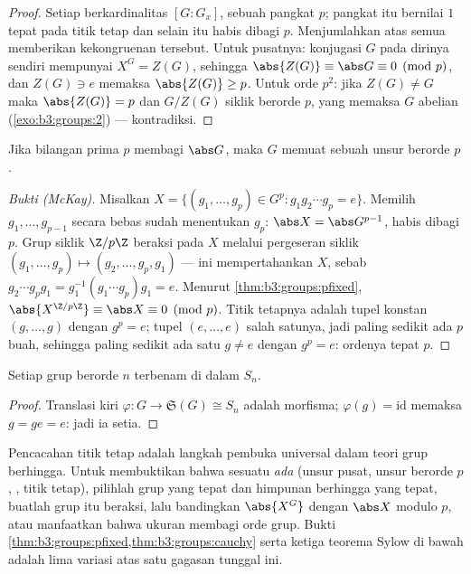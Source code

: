 \begin{proof}
Setiap  berkardinalitas $[G:G_x]$, sebuah pangkat $p$; pangkat itu
bernilai $1$ tepat pada titik tetap dan selain itu habis dibagi $p$. Menjumlahkan
atas semua  memberikan kekongruenan tersebut. Untuk pusatnya: 
konjugasi $G$ pada dirinya sendiri mempunyai $X^G = Z(G)$, sehingga $\abs{Z(G)} \equiv
\abs G \equiv 0 \pmod p$, dan $Z(G) \ni e$ memaksa $\abs{Z(G)} \geq
p$. Untuk orde $p^2$: jika $Z(G) \neq G$ maka $\abs{Z(G)} = p$ dan
$G/Z(G)$ siklik berorde $p$, yang memaksa $G$ abelian
(\cref{exo:b3:groups:2}) --- kontradiksi.
\end{proof}

\begin{theorem}[Cauchy]\label{thm:b3:groups:cauchy}
Jika bilangan prima $p$ membagi $\abs G$, maka $G$ memuat sebuah unsur
berorde $p$.
\end{theorem}

\begin{proof}[Bukti (McKay)]
Misalkan $X = \{(g_1, \dots, g_p) \in G^p : g_1 g_2 \cdots g_p = e\}$.
Memilih $g_1, \dots, g_{p-1}$ secara bebas sudah menentukan $g_p$: $\abs X =
\abs G^{p-1}$, habis dibagi $p$. Grup siklik $\Z/p\Z$ beraksi pada
$X$ melalui pergeseran siklik $(g_1, \dots, g_p) \mapsto (g_2, \dots, g_p,
g_1)$ ---  ini mempertahankan $X$, sebab $g_2 \cdots g_p g_1 =
g_1^{-1}(g_1 \cdots g_p)g_1 = e$. Menurut \cref{thm:b3:groups:pfixed},
$\abs{X^{\Z/p\Z}} \equiv \abs X \equiv 0 \pmod p$. Titik tetapnya adalah
tupel konstan $(g, \dots, g)$ dengan $g^p = e$; tupel $(e,
\dots, e)$ salah satunya, jadi paling sedikit ada $p$ buah, sehingga
paling sedikit ada satu $g \neq e$ dengan $g^p = e$: ordenya tepat $p$.
\end{proof}

\begin{theorem}[Cayley]\label{thm:b3:groups:cayley}
Setiap grup berorde $n$ terbenam di dalam $S_n$.
\end{theorem}

\begin{proof}
Translasi kiri $\varphi \colon G \to \mathfrak S(G) \cong S_n$ adalah
morfisma; $\varphi(g) = \mathrm{id}$ memaksa $g = ge = e$: jadi ia
setia.
\end{proof}

\begin{method}\label{met:b3:groups:counting}
Pencacahan titik tetap adalah langkah pembuka universal dalam teori
grup berhingga. Untuk membuktikan bahwa sesuatu \emph{ada} (unsur pusat,
unsur berorde $p$, , titik tetap), pilihlah grup yang
tepat dan himpunan berhingga yang tepat, buatlah grup itu beraksi, lalu bandingkan
$\abs{X^G}$ dengan $\abs X$ modulo $p$, atau manfaatkan bahwa ukuran  membagi
orde grup. Bukti
\cref{thm:b3:groups:pfixed,thm:b3:groups:cauchy} serta ketiga
teorema Sylow di bawah adalah lima variasi atas satu gagasan tunggal ini.
\end{method}


